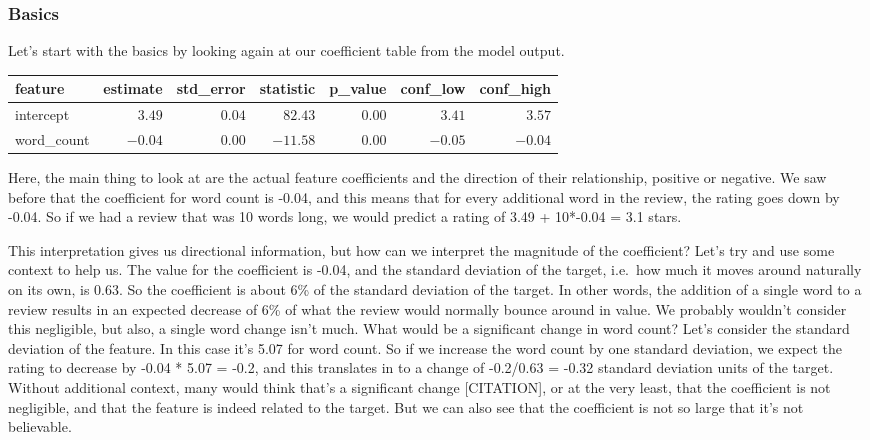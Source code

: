 \documentclass[
  letterpaper,
]{krantz}
\begin{document}
\subsubsection{Basics}\label{basics}

Let's start with the basics by looking again at our coefficient table
from the model output.

\begin{longtable*}{lrrrrrr}
\toprule
feature & estimate & std\_error & statistic & p\_value & conf\_low & conf\_high \\ 
\midrule\addlinespace[2.5pt]
intercept & \textcolor[HTML]{404040}{$3.49$} & \textcolor[HTML]{404040}{$0.04$} & \textcolor[HTML]{404040}{$82.43$} & \textcolor[HTML]{404040}{$0.00$} & \textcolor[HTML]{404040}{$3.41$} & \textcolor[HTML]{404040}{$3.57$} \\ 
word\_count & \textcolor[HTML]{404040}{$-0.04$} & \textcolor[HTML]{404040}{$0.00$} & \textcolor[HTML]{404040}{$-11.58$} & \textcolor[HTML]{404040}{$0.00$} & \textcolor[HTML]{404040}{$-0.05$} & \textcolor[HTML]{404040}{$-0.04$} \\ 
\bottomrule
\end{longtable*}

Here, the main thing to look at are the actual feature coefficients and
the direction of their relationship, positive or negative. We saw before
that the coefficient for word count is -0.04, and this means that for
every additional word in the review, the rating goes down by -0.04. So
if we had a review that was 10 words long, we would predict a rating of
3.49 + 10*-0.04 = 3.1 stars.

This interpretation gives us directional information, but how can we
interpret the magnitude of the coefficient? Let's try and use some
context to help us. The value for the coefficient is -0.04, and the
standard deviation of the target, i.e.~how much it moves around
naturally on its own, is 0.63. So the coefficient is about 6\% of the
standard deviation of the target. In other words, the addition of a
single word to a review results in an expected decrease of 6\% of what
the review would normally bounce around in value. We probably wouldn't
consider this negligible, but also, a single word change isn't much.
What would be a significant change in word count? Let's consider the
standard deviation of the feature. In this case it's 5.07 for word
count. So if we increase the word count by one standard deviation, we
expect the rating to decrease by -0.04 * 5.07 = -0.2, and this
translates in to a change of -0.2/0.63 = -0.32 standard deviation units
of the target. Without additional context, many would think that's a
significant change {[}CITATION{]}, or at the very least, that the
coefficient is not negligible, and that the feature is indeed related to
the target. But we can also see that the coefficient is not so large
that it's not believable.
\end{document}
